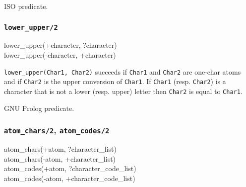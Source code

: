 \Portability

ISO predicate.

\subsubsection{\texttt{lower\_upper/2}}

\begin{TemplatesOneCol}
lower\_upper(+character, ?character)\\
lower\_upper(-character, +character)

\end{TemplatesOneCol}

\Description

\texttt{lower\_upper(Char1, Char2)} succeeds if \texttt{Char1} and
\texttt{Char2} are one-char atoms and if \texttt{Char2} is the upper
conversion of \texttt{Char1}. If \texttt{Char1} (resp. \texttt{Char2}) is a
character that is not a lower (resp. upper) letter then \texttt{Char2} is
equal to \texttt{Char1}.

\begin{PlErrors}




\end{PlErrors}

\Portability

GNU Prolog predicate.

\subsubsection{\texttt{atom\_chars/2},
               \texttt{atom\_codes/2}}
\label{atom-chars/2}

\begin{TemplatesOneCol}
atom\_chars(+atom, ?character\_list)\\
atom\_chars(-atom, +character\_list)\\
atom\_codes(+atom, ?character\_code\_list)\\
atom\_codes(-atom, +character\_code\_list)

\end{TemplatesOneCol}

